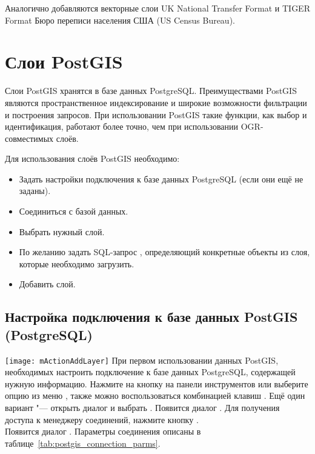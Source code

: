 Аналогично добавляются векторные слои UK National Transfer Format и
TIGER Format Бюро переписи населения США (US Census Bureau).

\section{Слои PostGIS}
\label{label_postgis}

Слои PostGIS хранятся в базе данных PostgreSQL. Преимуществами PostGIS
являются пространственное индексирование и широкие возможности
фильтрации и построения запросов. При использовании PostGIS такие функции,
как выбор и идентификация, работают более точно, чем при использовании
OGR-совместимых слоёв.

Для использования слоёв PostGIS необходимо:

\begin{itemize}[label=--]
\item Задать настройки подключения \qg к базе данных PostgreSQL (если они
ещё не заданы).
\item Соединиться с базой данных.
\item Выбрать нужный слой.
\item По желанию задать SQL-запрос , определяющий конкретные
объекты из слоя, которые необходимо загрузить.
\item Добавить слой.
\end{itemize}

\subsection{Настройка подключения к базе данных PostGIS (PostgreSQL)}\label{sec:postgis_stored}

\texttt{[image: mActionAddLayer]} При первом использовании
данных PostGIS, необходимых настроить подключение к базе данных PostgreSQL,
содержащей нужную информацию. Нажмите на кнопку
 на панели инструментов
или выберите опцию 
из меню , также можно воспользоваться комбинацией клавиш
. Ещё один вариант "--- открыть диалог
 и выбрать .
Появится диалог . Для получения доступа
к менеджеру соединений, нажмите кнопку
. \\
Появится диалог . Параметры соединения
описаны в таблице~\ref{tab:postgis_connection_parms}.

